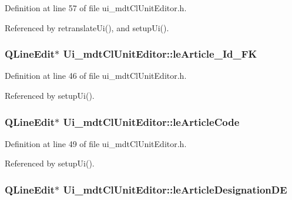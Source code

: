 Definition at line 57 of file ui\-\_\-mdt\-Cl\-Unit\-Editor.\-h.



Referenced by retranslate\-Ui(), and setup\-Ui().

\hypertarget{class_ui__mdt_cl_unit_editor_a888f05c1a9e646557654dabb133f0bd2}{
\subsubsection[{le\-Article\-\_\-\-Id\-\_\-\-F\-K}]{\setlength{\rightskip}{0pt plus 5cm}Q\-Line\-Edit$\ast$ Ui\-\_\-mdt\-Cl\-Unit\-Editor\-::le\-Article\-\_\-\-Id\-\_\-\-F\-K}}\label{class_ui__mdt_cl_unit_editor_a888f05c1a9e646557654dabb133f0bd2}


Definition at line 46 of file ui\-\_\-mdt\-Cl\-Unit\-Editor.\-h.



Referenced by setup\-Ui().

\hypertarget{class_ui__mdt_cl_unit_editor_a783c3cf4ce7ba38a1866a939cd841c74}{
\subsubsection[{le\-Article\-Code}]{\setlength{\rightskip}{0pt plus 5cm}Q\-Line\-Edit$\ast$ Ui\-\_\-mdt\-Cl\-Unit\-Editor\-::le\-Article\-Code}}\label{class_ui__mdt_cl_unit_editor_a783c3cf4ce7ba38a1866a939cd841c74}


Definition at line 49 of file ui\-\_\-mdt\-Cl\-Unit\-Editor.\-h.



Referenced by setup\-Ui().

\hypertarget{class_ui__mdt_cl_unit_editor_a80d023bba371bcb839d001eb0a6f7c73}{
\subsubsection[{le\-Article\-Designation\-D\-E}]{\setlength{\rightskip}{0pt plus 5cm}Q\-Line\-Edit$\ast$ Ui\-\_\-mdt\-Cl\-Unit\-Editor\-::le\-Article\-Designation\-D\-E}}\label{class_ui__mdt_cl_unit_editor_a80d023bba371bcb839d001eb0a6f7c73}


